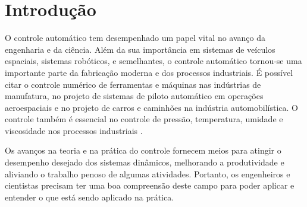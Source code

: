 \documentclass[
	12pt,				%
	openany,			%
	oneside,			%
	a4paper,			%
	english,			%
	french,				%
	spanish,			%
	brazil,				%
	]{abntex2}
\begin{document}
{%

\tableofcontents*
\cleardoublepage


\textual

\chapter*[Introdução]{Introdução}

O controle automático tem desempenhado um papel vital no avanço da engenharia e da ciência. Além da sua importância em sistemas de veículos espaciais, sistemas robóticos, e semelhantes, o controle automático tornou-se uma importante parte da fabricação moderna e dos processos industriais. É possível citar o controle numérico de ferramentas e máquinas nas indústrias de manufatura, no projeto de sistemas de piloto automático em operações aeroespaciais e no projeto de carros e caminhões na indústria automobilística. O controle também é essencial no controle de pressão, temperatura, umidade e viscosidade nos processos industriais \cite{ogata}.

Os avanços na teoria e na prática do controle fornecem meios para atingir o desempenho desejado dos sistemas dinâmicos, melhorando a produtividade e aliviando o trabalho penoso de algumas atividades. Portanto, os engenheiros e cientistas precisam ter uma boa compreensão deste campo para poder aplicar e entender o que está sendo aplicado na prática.




}
\end{document}
